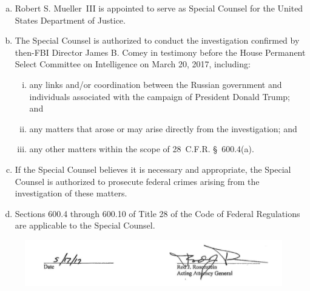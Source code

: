 \begin{enumerate}[(a)]
    \item Robert S. Mueller~III is appointed to serve as Special Counsel for the United States Department of Justice.

    \item The Special Counsel is authorized to conduct the investigation confirmed by then-FBI Director James B. Comey in testimony before the House Permanent Select Committee on Intelligence on March 20, 2017, including:

    \begin{enumerate}[(i)]
        \item any links and/or coordination between the Russian government and individuals associated with the campaign of President Donald Trump; and

        \item any matters that arose or may arise directly from the investigation; and

        \item any other matters within the scope of 28~C.F.R. \S~600.4(a).
    \end{enumerate}

    \item If the Special Counsel believes it is necessary and appropriate, the Special Counsel is authorized to prosecute federal crimes arising from the investigation of these matters.

    \item Sections 600.4 through 600.10 of Title 28 of the Code of Federal Regulations are applicable to the Special Counsel.
\end{enumerate}

\begin{figure}[hb]
    \vspace{-20pt}
    \begin{center}
        \includegraphics[width=6in]{images/appendix-a-signature.png}%
    \end{center}
    \vspace{-20pt}
\end{figure}
